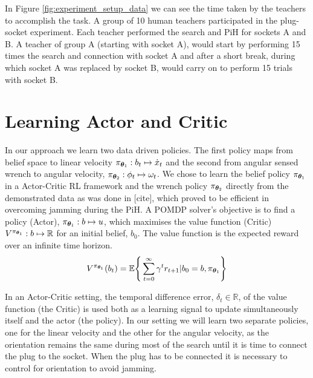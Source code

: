 In Figure \ref{fig:experiment_setup_data} we can see the time taken by the teachers to accomplish the task. 
A group of 10 human teachers participated in the plug-socket experiment. Each teacher performed the search and PiH 
for sockets A and B. A teacher of group A (starting with socket A), would start by performing 15 times the search and connection 
with socket A and after a short break, during which socket A was replaced by socket B, would carry on to perform 15 trials 
with socket B.



\section{Learning Actor and Critic}\label{ch4:learning-value-actor}

In our approach we learn two data driven policies. The first policy maps from belief space 
to linear velocity $\pi_{\boldsymbol{\theta}_1} : b_t \mapsto \dot{x}_t$ and the second from 
angular sensed wrench to angular velocity, $ \pi_{\boldsymbol{\theta}_2} : \phi_t \mapsto \omega_t$.
We chose to learn the belief policy $\pi_{\boldsymbol{\theta}_1}$ in a Actor-Critic RL framework 
and the wrench policy $\pi_{\boldsymbol{\theta}_2}$ directly from the demonstrated data as was done 
in [cite], which proved to be efficient in overcoming jamming during the PiH. 
A POMDP solver's objective is to find a policy (Actor), $\pi_{\boldsymbol{\theta}_1}: b \mapsto u$, which maximises 
the value function (Critic) $V^{\pi_{\boldsymbol{\theta}_1}} : b \mapsto \mathbb{R}$ for an initial belief, $b_{0}$. The value function
is the expected reward over an infinite time horizon.
\begin{equation}\label{eq:value_function}
  V^{\pi_{\boldsymbol{\theta}_1}}(b_t) = \mathbb{E}\Bigg\{ \sum_{t=0}^{\infty} \gamma^{t} r_{t+1} | b_0=b,\pi_{\boldsymbol{\theta}_1}\Bigg\}
\end{equation}

In an Actor-Critic setting, the temporal difference error, $\delta_t \in \mathbb{R}$, of the value function (the Critic) is 
used both as a learning signal to update simultaneously itself and the actor (the policy). In our setting we will 
learn two separate policies, one for the linear velocity and the other for the angular velocity,
as the orientation remains the same during most of the search until it is time to connect the plug to the socket. 
When the plug has to be connected it is necessary to control for orientation to avoid jamming. 

